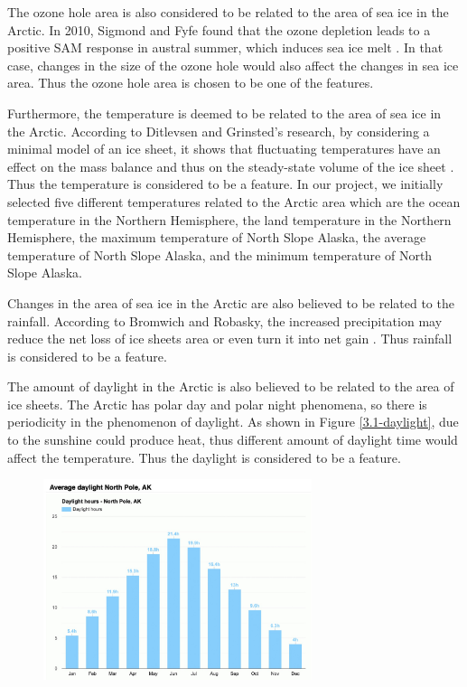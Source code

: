 The ozone hole area is also considered to be related to the area of sea ice in the Arctic. In 2010, Sigmond and Fyfe found that the ozone depletion leads to a positive SAM response in austral summer, which induces sea ice melt \cite{sigmond2010has}. In that case, changes in the size of the ozone hole would also affect the changes in sea ice area. Thus the ozone hole area is chosen to be one of the features.

Furthermore, the temperature is deemed to be related to the area of sea ice in the Arctic. According to Ditlevsen and Grinsted's research, by considering a minimal model of an ice sheet, it shows that fluctuating temperatures have an effect on the mass balance and thus on the steady-state volume of the ice sheet \cite{mikkelsen2018influence}. Thus the temperature is considered to be a feature. In our project, we initially selected five different temperatures related to the Arctic area which are the ocean temperature in the Northern Hemisphere, the land temperature in the Northern Hemisphere, the maximum temperature of North Slope Alaska, the average temperature of North Slope Alaska, and the minimum temperature of North Slope Alaska.

Changes in the area of sea ice in the Arctic are also believed to be related to the rainfall. According to Bromwich and Robasky, the increased precipitation may reduce the net loss of ice sheets area or even turn it into net gain \cite{Bromwich1993RecentPT}. Thus rainfall is considered to be a feature.


The amount of daylight in the Arctic is also believed to be related to the area of ice sheets. The Arctic has polar day and polar night phenomena, so there is periodicity in the phenomenon of daylight. As shown in Figure \ref{3.1-daylight}, due to the sunshine could produce heat, thus different amount of daylight time would affect the temperature. Thus the daylight is considered to be a feature.


\begin{figure}[htbp]
\center
\includegraphics[width = 0.7\textwidth]{Figure/3.1-daylight.jpeg}
\end{figure}
